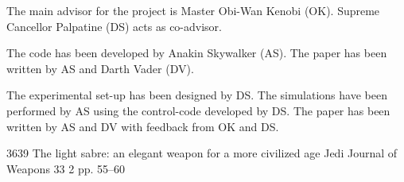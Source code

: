 %
\begin{divisionofwork}
{%
	The main advisor for the project is Master Obi-Wan Kenobi (OK).
	Supreme Cancellor Palpatine (DS) acts as co-advisor.
}%

	\paperitem
		The code has been developed by Anakin Skywalker (AS).
		The paper has been written by AS and Darth Vader (DV).

	\paperitem
		The experimental set-up has been designed by DS.
		The simulations have been performed by AS using the control-code
		developed by DS.
		The paper has been written by AS and DV with feedback from OK and DS.

\end{divisionofwork}


%
\begin{papersnotincluded}

          {3639}%
          {The light sabre: an elegant weapon for a more civilized age}%
          {Jedi Journal of Weapons}%
          {33}%
          {2}%
          {pp. 55--60}%

\end{papersnotincluded}


%
\tableofcontents

